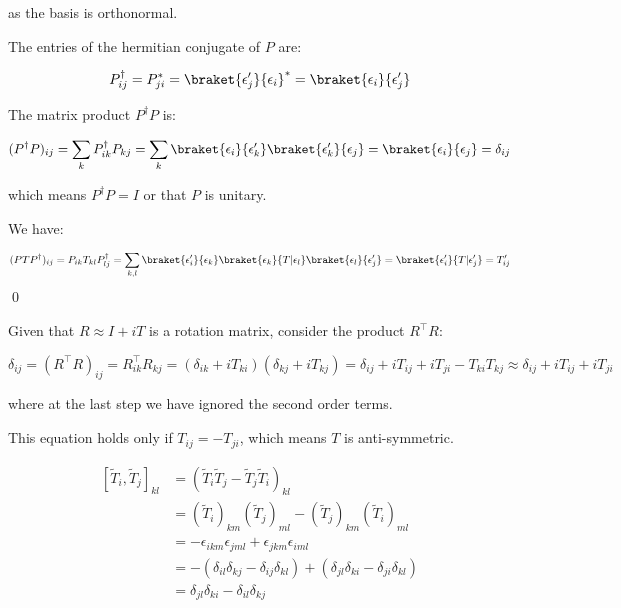 \documentclass[12pt]{article}
\begin{document}
as the basis is orthonormal.

The entries of the hermitian conjugate of $P$ are:

\begin{equation}
    P^{\dagger}_{ij} = P_{ji}^{*} = \braket{\epsilon'_{j}}{\epsilon_{i}}^{*} = \braket{\epsilon_{i}}{\epsilon'_{j}}
\end{equation}

The matrix product $P^{\dagger} P$ is:

\begin{equation}
    (P^{\dagger} P)_{ij} = \sum_{k} P^{\dagger}_{ik} P_{kj} = \sum_{k} \braket{\epsilon_{i}}{\epsilon'_{k}} \braket{\epsilon'_{k}}{\epsilon_{j}} = \braket{\epsilon_{i}}{\epsilon_{j}} = \delta_{ij}
\end{equation}

which means $P^{\dagger} P = I$ or that $P$ is unitary.

We have:

\begin{equation}
    (PTP^{\dagger})_{ij} = P_{ik} T_{kl} P^{\dagger}_{lj} = \sum_{k, l} \braket{\epsilon'_{i}}{\epsilon_{k}} \braket{\epsilon_{k}}{T|\epsilon_{l}} \braket{\epsilon_{l}}{\epsilon'_{j}} = \braket{\epsilon'_{i}}{T|\epsilon'_{j}} = T'_{ij}
\end{equation}
\qed



Given that $R \approx I + iT$ is a rotation matrix, consider the product $R^{\intercal} R$:

\begin{equation}
    \delta_{ij} = (R^{\intercal} R)_{ij} = R^{\intercal}_{ik} R_{kj} = (\delta_{ik} + i T_{ki})(\delta_{kj} + i T_{kj}) = \delta_{ij} + i T_{ij} + i T_{ji} - T_{ki} T_{kj} \approx \delta_{ij} + i T_{ij} + i T_{ji}
\end{equation}

where at the last step we have ignored the second order terms.

This equation holds only if $T_{ij} = - T_{ji}$, which means $T$ is anti-symmetric.


\begin{equation}
\begin{split}
    [\tilde{T}_{i}, \tilde{T}_{j}]_{kl} &= \left( \tilde{T}_{i} \tilde{T}_{j} - \tilde{T}_{j} \tilde{T}_{i} \right)_{kl} \\
    &= \left( \tilde{T}_{i} \right)_{km} \left( \tilde{T}_{j} \right)_{ml} - \left( \tilde{T}_{j} \right)_{km} \left( \tilde{T}_{i} \right)_{ml} \\
    &= -\epsilon_{ikm} \epsilon_{jml} + \epsilon_{jkm} \epsilon_{iml} \\
    &= -(\delta_{il} \delta_{kj} - \delta_{ij} \delta_{kl}) + (\delta_{jl} \delta_{ki} - \delta_{ji} \delta_{kl}) \\
    &= \delta_{jl} \delta_{ki} - \delta_{il} \delta_{kj}
\end{split}
\end{equation}
\end{document}
